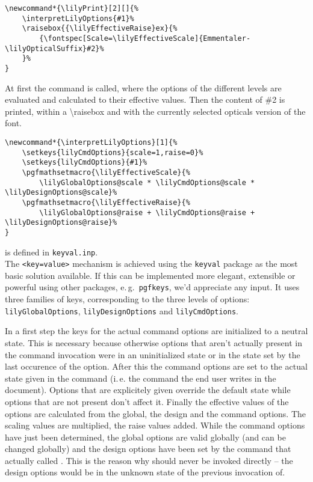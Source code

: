 \documentclass{OLLbook}
\begin{document}
\begin{verbatim}
\newcommand*{\lilyPrint}[2][]{%
    \interpretLilyOptions{#1}%
    \raisebox{{\lilyEffectiveRaise}ex}{%
        {\fontspec[Scale=\lilyEffectiveScale]{Emmentaler-\lilyOpticalSuffix}#2}%
    }%
}
\end{verbatim}

At first the command  is called, where the options of the different levels are evaluated and calculated to their effective values.
Then the content of \#2 is printed, within a \textbackslash raisebox and with the currently selected opticals version of the \emmentaler font.

\begin{verbatim}
\newcommand*{\interpretLilyOptions}[1]{%
    \setkeys{lilyCmdOptions}{scale=1,raise=0}%
    \setkeys{lilyCmdOptions}{#1}%
    \pgfmathsetmacro{\lilyEffectiveScale}{%
        \lilyGlobalOptions@scale * \lilyCmdOptions@scale * \lilyDesignOptions@scale}%
    \pgfmathsetmacro{\lilyEffectiveRaise}{%
        \lilyGlobalOptions@raise + \lilyCmdOptions@raise + \lilyDesignOptions@raise}%
}
\end{verbatim}
 is defined in \texttt{keyval.inp}.\\
The \texttt{<key=value>} mechanism is achieved using the \texttt{keyval} package as the most basic solution available.
{\color{red} If this can be implemented more elegant, extensible or powerful using other packages, e.\,g.\ \texttt{pgfkeys}, we'd appreciate any input.}
It uses three families of keys, corresponding to the three levels of options:
\texttt{lilyGlobalOptions}, \texttt{lilyDesignOptions} and \texttt{lilyCmdOptions}.

In a first step the keys for the actual command options are initialized to a neutral state.
This is necessary because otherwise options that aren't actually present in the command invocation were in an uninitialized state or in the state set by the last occurence of the option.
After this the command options are set to the actual state given in the command (i.\,e. the command the end user writes in the document).
Options that are explicitely given override the default state while options that are not present don't affect it.
Finally the effective values of the options are calculated from the global, the design and the command options. 
The scaling values are multiplied, the raise values added.
While the command options have just been determined, the global options are valid globally (and can be changed globally) and the design options have been set by the command that actually called .
This is the reason why  should never be invoked directly -- the design options would be in the unknown state of the previous invocation of.
\end{document}
